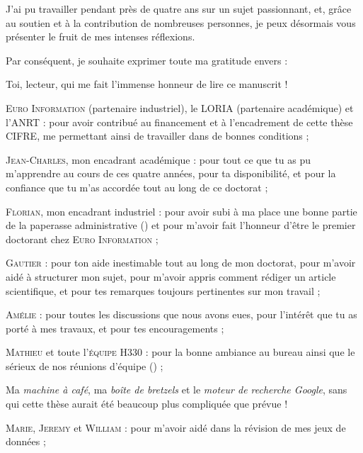 \begin{ThesisAcknowledgments}

	J'ai pu travailler pendant près de quatre ans sur un sujet passionnant, et, grâce au soutien et à la contribution de nombreuses personnes, je peux désormais vous présenter le fruit de mes intenses réflexions.
	
	Par conséquent, je souhaite exprimer toute ma gratitude envers :
	\begin{todolist}
		\item[\itemok] Toi, lecteur, qui me fait l'immense honneur de lire ce manuscrit ! \faThumbsUp
		\item[\itemok] \textsc{Euro Information} (partenaire industriel), le \textsc{LORIA} (partenaire académique) et l'\textsc{ANRT} :
		pour avoir contribué au financement et à l’encadrement de cette thèse CIFRE, me permettant ainsi de travailler dans de bonnes conditions ;
		\item[\itemok] \textsc{Jean-Charles}, mon encadrant académique :
		pour tout ce que tu as pu m'apprendre au cours de ces quatre années, pour ta disponibilité, et pour la confiance que tu m'as accordée tout au long de ce doctorat ;
		\item[\itemok] \textsc{Florian}, mon encadrant industriel :
		pour avoir subi à ma place une bonne partie de la paperasse administrative (\faGrinTongueWink) et pour m'avoir fait l'honneur d'être le premier doctorant chez \textsc{Euro Information} ;
		\item[\itemok] \textsc{Gautier} :
		pour ton aide inestimable tout au long de mon doctorat, pour m'avoir aidé à structurer mon sujet, pour m'avoir appris comment rédiger un article scientifique, et pour tes remarques toujours pertinentes sur mon travail ;
		\item[\itemok] \textsc{Amélie} : pour toutes les discussions que nous avons eues, pour l’intérêt que tu as porté à mes travaux, et pour tes encouragements ;
		\item[\itemok] \textsc{Mathieu} et toute l'\textsc{équipe H330} : pour la bonne ambiance au bureau ainsi que le sérieux de nos réunions d'équipe (\faGrinTongueWink) ;
		\item[\itemok] Ma \textit{machine à café}, ma \textit{boîte de bretzels} et le \textit{moteur de recherche Google}, sans qui cette thèse aurait été beaucoup plus compliquée que prévue ! \faGrinBeamSweat
		\item[\itemok] \textsc{Marie}, \textsc{Jeremy} et \textsc{William} : pour m'avoir aidé dans la révision de mes jeux de données ;

\end{todolist}
\end{ThesisAcknowledgments}
